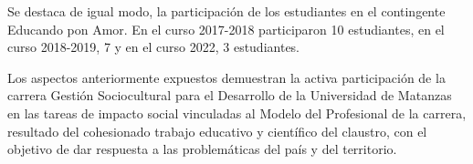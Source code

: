 Se destaca de igual modo, la participación de los estudiantes en el contingente Educando pon Amor. En el curso 2017-2018 participaron 10 estudiantes, en el curso 2018-2019, 7 y en el curso 2022, 3 estudiantes.

Los aspectos anteriormente expuestos demuestran la activa participación de la carrera Gestión Sociocultural para el Desarrollo de la Universidad de Matanzas en las tareas de impacto social vinculadas al Modelo del Profesional de la carrera, resultado del cohesionado trabajo educativo y científico del claustro, con el objetivo de dar respuesta a las problemáticas del país y del territorio.